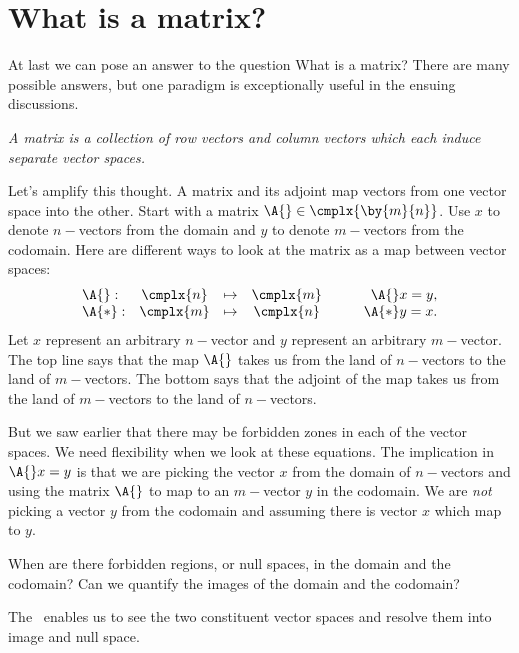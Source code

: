 \section{What is a matrix?}
At last we can pose an answer to the question What is a matrix? There are many possible answers, but one paradigm is exceptionally useful in the ensuing discussions.

\textit{A matrix is a collection of row vectors and column vectors which each induce separate vector spaces.} 

Let's amplify this thought. A matrix and its adjoint map vectors from one vector space into the other. Start with a matrix $\A{}\in\cmplx{\by{m}{n}}$. Use $x$ to denote $n-$vectors from the domain and $y$ to denote $m-$vectors from the codomain. Here are different ways to look at the matrix as a map between vector spaces:
\begin{equation}
\begin{array}{lcccr}
  \A{}:  &\cmplx{n} & \mapsto & \cmplx{m} & \qquad \A{}x=y,\\
  \A{*}: &\cmplx{m} & \mapsto & \cmplx{n} & \qquad \A{*}y=x.
\end{array}
\end{equation}
Let $x$ represent an arbitrary $n-$vector and $y$ represent an arbitrary $m-$vector. The top line says that the map $\A{}$ takes us from the land of $n-$vectors to the land of $m-$vectors. The bottom says that the adjoint of the map takes us from the land of $m-$vectors to the land of $n-$vectors.

But we saw earlier that there may be forbidden zones in each of the vector spaces. We need flexibility when we look at these equations. The implication in $\A{}x=y$ is that we are picking the vector $x$ from the domain of $n-$vectors and using the matrix $\A{}$ to map to an $m-$vector $y$ in the codomain. We are \textit{not} picking a vector $y$ from the codomain and assuming there is vector $x$ which map to $y$.

When are there forbidden regions, or null spaces, in the domain and the codomain? Can we quantify the images of the domain and the codomain?

The \svdl \ enables us to see the two constituent vector spaces and resolve them into image and null space.

\endinput